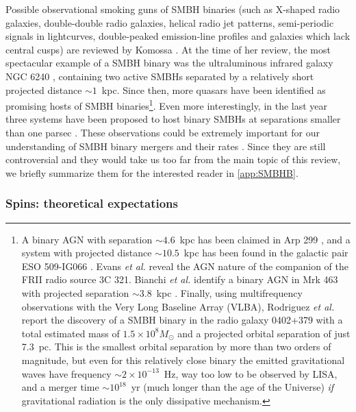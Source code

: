 \documentclass[]{iopart}
\begin{document}
Possible observational smoking guns of SMBH binaries (such as X-shaped radio
galaxies, double-double radio galaxies, helical radio jet patterns,
semi-periodic signals in lightcurves, double-peaked emission-line profiles and
galaxies which lack central cusps) are reviewed by Komossa
\cite{Komossa:2003wz}.
%
At the time of her review, the most spectacular example of a SMBH binary was
the ultraluminous infrared galaxy NGC 6240 \cite{Komossa:2002tn}, containing
two active SMBHs separated by a relatively short projected distance
$\sim 1$~kpc.
Since then, more quasars have been identified as promising hosts of SMBH
binaries\footnote{A binary AGN with separation $\sim 4.6$~kpc has been claimed
  in Arp 299 \cite{Ballo:2003ww}, and a system with projected distance $\sim
  10.5$~kpc has been found in the galactic pair ESO 509-IG066
  \cite{Guainazzi:2004ky}. Evans {\it et al.} \cite{Evans:2007nq} reveal the
  AGN nature of the companion of the FRII radio source 3C 321. Bianchi {\it et
    al.}  identify a binary AGN in Mrk 463 with projected separation $\sim
  3.8$~kpc \cite{Bianchi:2008un}.
%
Finally, using multifrequency observations with the Very Long Baseline Array
(VLBA), Rodriguez {\it et al.} \cite{Rodriguez:2006th,Rodriguez:2009ax} report
the discovery of a SMBH binary in the radio galaxy 0402+379 with a total
estimated mass of $1.5\times 10^8M_\odot$ and a projected orbital separation
of just 7.3~pc. This is the smallest orbital separation by more than two
orders of magnitude, but even for this relatively close binary the emitted
gravitational waves have frequency $\sim 2\times 10^{-13}$~Hz, way too low to
be observed by LISA, and a merger time $\sim 10^{18}$~yr (much longer than the
age of the Universe) {\it if} gravitational radiation is the only dissipative
mechanism.}.
Even more interestingly, in the last year three systems have been proposed to
host binary SMBHs at separations smaller than one parsec
\cite{Valtonen:2008tx,Boroson:2009va}. These observations could be extremely
important for our understanding of SMBH binary mergers and their rates
\cite{Volonteri:2009nh}.  Since they are still controversial and they would
take us too far from the main topic of this review, we briefly summarize them
for the interested reader in \ref{app:SMBHB}.

\subsubsection*{Spins: theoretical expectations} 
\end{document}

